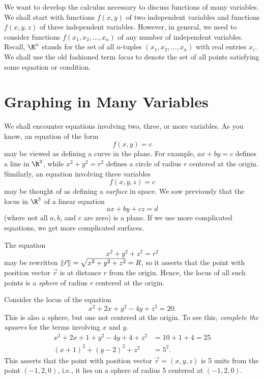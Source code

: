 
We want to develop the calculus necessary to discuss functions
of many variables.   We shall start with functions
$f(x,y)$ of two independent
variables and functions $f(x,y,z)$ of three independent
variables.   However, in general, we need to consider functions
$f(x_1, x_2, \dots, x_n)$ of any number 
of independent variables.   Recall, $\R^n$ stands
for the set of all $n$-tuples $(x_1,x_2,\dots,x_n)$
with real entries $x_i$.  We shall use the old fashioned term \emph{locus}
to denote the set of all points satisfying some equation or condition.

\section{Graphing in Many Variables}

We shall encounter equations involving two, three, or more variables.
As you know, an equation of the form
\[
     f(x,y) = c
\]
may be viewed as defining a curve in the plane.  For example,
$ax + by = c$ defines a line in $\R^2$, while $x^2 + y^2 = r^2$
defines a circle of radius $r$ centered at the origin.
Similarly, an equation involving three variables
\[
   f(x,y,z) = c
\]
may be thought of as defining a \emph{surface} in space.
We saw previously that the locus in $\R^3$ of a linear equation
\[
   ax + by + cz = d
\]
(where not all $a, b$, and $c$ are zero) is a plane.   If we
use more complicated equations, we get more complicated surfaces.

\begin{example}
	The equation
	\[
	   x^2 + y^2 + z^2 = r^2
	\]
	may be rewritten $\lVert\vec r\rVert = \sqrt{x^2 + y^2 + z^2} = R$, so it
	asserts that the point with position vector $\vec r$ is at distance
	$r$ from the origin.  Hence, the locus of all such points is a
	\emph{sphere} of radius $r$ centered at the origin.
\end{example}

\begin{example}
	Consider the locus of the equation
	\[
	  x^2 + 2x + y^2 - 4y + z^2 = 20.
	\]
	This is also a sphere, but one not centered at the origin.  To
	see this, \emph{complete the squares} for the terms involving
	$x$ and  $y$.
	\begin{align*}
	    x^2 + 2x + 1 + y^2 -4y + 4 + z^2 &= 10 + 1 + 4 = 25 \\
	    (x + 1)^2 + (y - 2)^2 + z^2 &= 5^2.
	\end{align*}
	This asserts that the point with position vector $\vec r = ( x, y, z )$
	is 5 units from the point $(-1, 2, 0)$, i.e., it lies on a sphere
	of radius 5 centered at $(-1, 2, 0)$.
\end{example}

